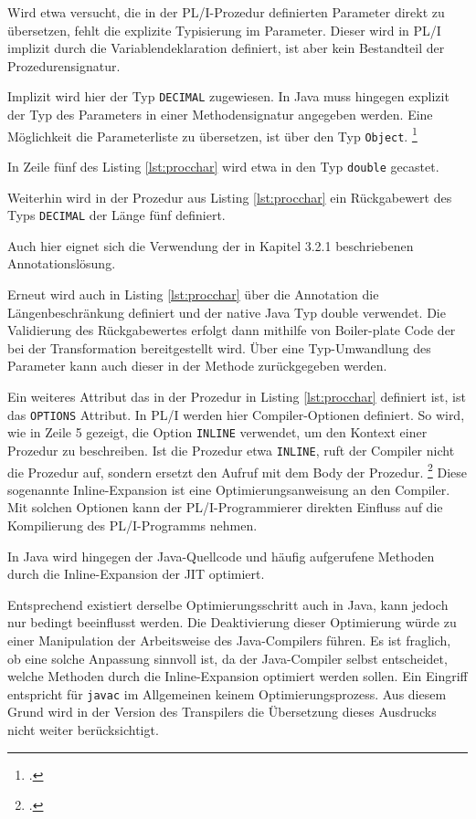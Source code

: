 Wird etwa versucht, die in der PL/I-Prozedur definierten Parameter direkt zu übersetzen, fehlt die explizite Typisierung im Parameter. Dieser wird in PL/I implizit durch die Variablendeklaration definiert,
ist aber kein Bestandteil der Prozedurensignatur. 

Implizit wird hier der Typ \verb+DECIMAL+ zugewiesen. 
In Java muss hingegen explizit der Typ des Parameters in einer Methodensignatur angegeben werden.
Eine M\"oglichkeit die Parameterliste zu übersetzen, ist über den Typ \verb+Object+. \footcite[Vgl. ][]{objectdocs}

In Zeile fünf des Listing \ref{lst:procchar} wird etwa in den Typ \verb+double+ gecastet.

Weiterhin wird in der Prozedur aus Listing \ref{lst:procchar} ein R\"uckgabewert des Typs \verb+DECIMAL+ der L\"ange f\"unf definiert.

Auch hier eignet sich die Verwendung der in Kapitel 3.2.1 beschriebenen Annotationslösung.

Erneut wird auch in Listing \ref{lst:procchar} über die Annotation die Längenbeschränkung definiert und der native Java Typ double verwendet.
Die Validierung des Rückgabewertes erfolgt dann mithilfe von Boiler-plate Code der bei der Transformation bereitgestellt wird.
Über eine Typ-Umwandlung des Parameter kann auch dieser in der Methode zurückgegeben werden. 

Ein weiteres Attribut das in der Prozedur in Listing \ref{lst:procchar} definiert ist, ist das \verb+OPTIONS+
Attribut.
In PL/I werden hier Compiler-Optionen definiert. So wird, wie in Zeile 5 gezeigt, die Option \verb+INLINE+ verwendet, um den Kontext einer Prozedur zu beschreiben. Ist die Prozedur etwa \verb+INLINE+, ruft der Compiler nicht die Prozedur auf, sondern ersetzt den Aufruf mit dem Body der Prozedur. \footcite[Vgl.][]{optionsstmt} Diese sogenannte Inline-Expansion ist eine Optimierungsanweisung an den Compiler. Mit solchen Optionen kann der PL/I-Programmierer direkten Einfluss auf die Kompilierung des PL/I-Programms nehmen.

In Java wird hingegen der Java-Quellcode und häufig aufgerufene Methoden durch die Inline-Expansion der \ac{JIT} optimiert.

Entsprechend existiert derselbe Optimierungsschritt auch in Java, kann jedoch nur bedingt beeinflusst werden. Die Deaktivierung dieser Optimierung würde zu einer Manipulation der Arbeitsweise des Java-Compilers führen. Es ist fraglich, ob eine solche Anpassung sinnvoll ist, da der Java-Compiler selbst entscheidet, welche Methoden durch die Inline-Expansion optimiert werden sollen. Ein Eingriff entspricht für \verb+javac+ im Allgemeinen keinem Optimierungsprozess.
Aus diesem Grund wird in der Version des Transpilers die Übersetzung dieses Ausdrucks nicht weiter berücksichtigt.


